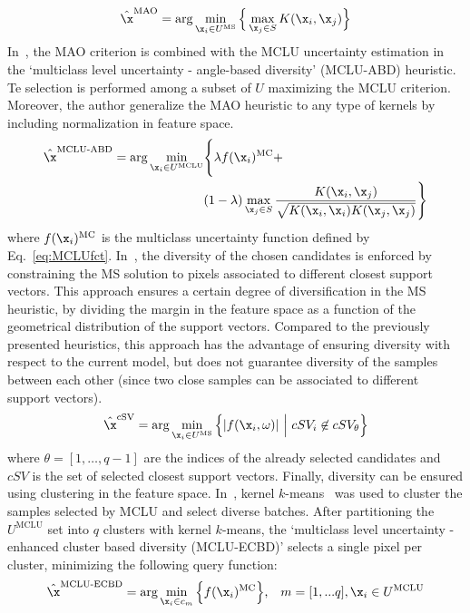 \begin{equation}
\hat{\x}^{\text{MAO}} = \arg \min_{\x_i \in U^{\text{MS}} }\Big\{\max_{\x_j \in S}K(\x_i,\x_j)\Big\}
\label{eq:MAO}
\end{equation}
In~, the MAO criterion is combined with the MCLU uncertainty estimation in the `multiclass level uncertainty - angle-based diversity' (MCLU-ABD) heuristic. Te selection is performed among a subset of $U$ maximizing the MCLU criterion. Moreover, the author generalize the MAO heuristic to any type of kernels by including normalization in feature space.
\begin{align}
\hat{\x}^{\text{MCLU-ABD}} = \arg \min_{\x_i \in U^{\text{MCLU}} }&\Bigg\{\lambda f(\x_i)^{\text{MC}} + \\\nonumber
&(1-\lambda)\max_{\x_j \in S}\frac{K(\x_i,\x_j)}{\sqrt{K(\x_i,\x_i)K(\x_j,\x_j)}}\Bigg\}\\
\label{eq:MCLU-ABD}
\end{align}
where $f(\x_i)^{\text{MC}}$ is the multiclass uncertainty function defined by Eq.~\eqref{eq:MCLUfct}.
In~, the diversity of the chosen candidates is enforced by constraining the MS solution to pixels associated to different closest support vectors. This approach ensures a certain degree of diversification in the MS heuristic, by dividing the margin in the feature space as a function of the geometrical distribution of the support vectors. Compared to the previously presented heuristics, this approach has the advantage of ensuring diversity with respect to the current model, but does not guarantee diversity of the samples between each other (since two close samples can be associated to different support vectors).
\begin{equation}
\hat{\x}^{\text{cSV}} = \arg \min_{\x_i \in U^{\text{MS}} } \Big\{\lvert f(\x_i,\omega)\rvert \   \Big\vert  \   cSV_i \not\in cSV_\theta\Big\}
\label{eq:cSV}
\end{equation}
where $\theta = [1, \ldots, q-1]$ are the indices of the already selected candidates and $cSV$ is the set of selected closest support vectors.
Finally, diversity can be ensured using clustering in the feature space. In~, kernel $k$-means~ was used to cluster the samples selected by MCLU and select diverse batches. After partitioning the $U^{\text{MCLU}}$ set into $q$ clusters with kernel $k$-means, the `multiclass level uncertainty - enhanced cluster based diversity (MCLU-ECBD)' selects a single pixel per cluster, minimizing the following query function:
\begin{equation}
\hat{\x}^{\text{MCLU-ECBD}} = \arg \min_{\x_i \in c_m}\Big\{ f(\x_i)^{\text{MC}}\Big\}\text{,} \quad m = [1, ... q],  \x_i \in U^{\text{MCLU}}
\label{eq:MCLU-ECBD}
\end{equation}
